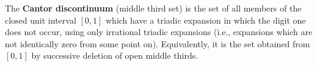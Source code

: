 The \textbf{Cantor discontinuum} (middle third set) is the set of all members of the closed unit interval $[0,1]$ which have a triadic expansion in which the digit one does not occur, using only irrational triadic expansions (i.e., expansions which are not identically zero from some point on). Equivalently, it is the set obtained from $[0,1]$ by successive deletion of open middle thirds.
